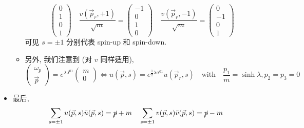 \begin{itemize}
\begin{itemize}
\begin{equation}
\begin{pmatrix}
				0 \\
				1 \\
				0 \\
				1
			\end{pmatrix} \quad \frac{v(\vec{p}_r, + 1)}{\sqrt{m}} = \begin{pmatrix}
				- 1 \\
				0 \\
				1 \\
				0
			\end{pmatrix} \quad \frac{v(\vec{p}_r, - 1)}{\sqrt{m}} = \begin{pmatrix}
				0 \\
				- 1 \\
				0 \\
				1
			\end{pmatrix}
		\end{equation}
		可见 $s = \pm 1$ 分别代表 spin-up 和 spin-down.
		
		\item 另外, 我们注意到 (对 $v$ 同样适用),
		\begin{equation}
			\begin{pmatrix}
				\omega_p \\
				\vec{p}
			\end{pmatrix} = e^{\lambda J^{0 1}} \begin{pmatrix}
				m \\
				0
			\end{pmatrix} \iff u(\vec{p}, s) = e^{\frac{1}{2} \lambda \sigma^{0 1}} u(\vec{p}_r, s) \quad \text{with} \quad \frac{p_1}{m} = \sinh \lambda, p_2 = p_3 = 0
		\end{equation}
	\end{itemize}
	
	\item 最后,
	\begin{equation}
		\sum_{s = \pm 1} u(\vec{p}, s) \bar{u}(\vec{p}, s) = \cancel{p} + m \quad \sum_{s = \pm 1} v(\vec{p}, s) \bar{v}(\vec{p}, s) = \cancel{p} - m
	\end{equation}
	

\end{itemize}

